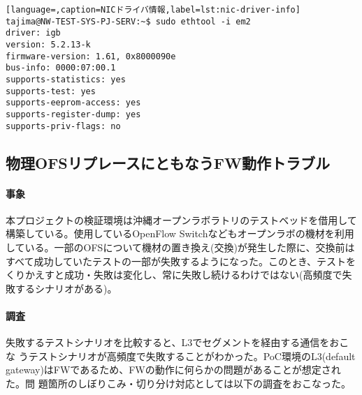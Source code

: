 \begin{lstlisting}[language=,caption=NICドライバ情報,label=lst:nic-driver-info]
tajima@NW-TEST-SYS-PJ-SERV:~$ sudo ethtool -i em2
driver: igb
version: 5.2.13-k
firmware-version: 1.61, 0x8000090e
bus-info: 0000:07:00.1
supports-statistics: yes
supports-test: yes
supports-eeprom-access: yes
supports-register-dump: yes
supports-priv-flags: no
\end{lstlisting}

 \subsection{物理OFSリプレースにともなうFW動作トラブル}
 \label{sec:ofs-replace-fw-trouble}

    \paragraph{事象}
本プロジェクトの検証環境は沖縄オープンラボラトリのテストベッドを借用して
構築している。使用しているOpenFlow Switchなどもオープンラボの機材を利用
している。一部のOFSについて機材の置き換え(交換)が発生した際に、交換前は
すべて成功していたテストの一部が失敗するようになった。このとき、テストを
くりかえすと成功・失敗は変化し、常に失敗し続けるわけではない(高頻度で失
敗するシナリオがある)。

    \paragraph{調査}
失敗するテストシナリオを比較すると、L3でセグメントを経由する通信をおこな
うテストシナリオが高頻度で失敗することがわかった。PoC環境のL3(default
gateway)はFWであるため、FWの動作に何らかの問題があることが想定された。問
題箇所のしぼりこみ・切り分け対応としては以下の調査をおこなった。

